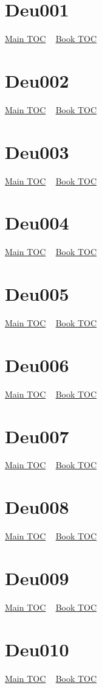 \documentclass{book}
\begin{document}
  \section{Deu001}\hyperlink{toc}{Main TOC} ~ \hyperref[subsec:Deu]{Book TOC} 
  \section{Deu002}\hyperlink{toc}{Main TOC} ~ \hyperref[subsec:Deu]{Book TOC} 
  \section{Deu003}\hyperlink{toc}{Main TOC} ~ \hyperref[subsec:Deu]{Book TOC} 
  \section{Deu004}\hyperlink{toc}{Main TOC} ~ \hyperref[subsec:Deu]{Book TOC} 
  \section{Deu005}\hyperlink{toc}{Main TOC} ~ \hyperref[subsec:Deu]{Book TOC} 
  \section{Deu006}\hyperlink{toc}{Main TOC} ~ \hyperref[subsec:Deu]{Book TOC} 
  \section{Deu007}\hyperlink{toc}{Main TOC} ~ \hyperref[subsec:Deu]{Book TOC} 
  \section{Deu008}\hyperlink{toc}{Main TOC} ~ \hyperref[subsec:Deu]{Book TOC} 
  \section{Deu009}\hyperlink{toc}{Main TOC} ~ \hyperref[subsec:Deu]{Book TOC} 
  \section{Deu010}\hyperlink{toc}{Main TOC} ~ \hyperref[subsec:Deu]{Book TOC} 
\end{document}
